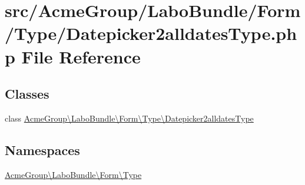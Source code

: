 \hypertarget{_datepicker2alldates_type_8php}{\section{src/\+Acme\+Group/\+Labo\+Bundle/\+Form/\+Type/\+Datepicker2alldates\+Type.php File Reference}
\label{_datepicker2alldates_type_8php}
}
\subsection*{Classes}
\begin{DoxyCompactItemize}
\item 
class \hyperlink{class_acme_group_1_1_labo_bundle_1_1_form_1_1_type_1_1_datepicker2alldates_type}{Acme\+Group\textbackslash{}\+Labo\+Bundle\textbackslash{}\+Form\textbackslash{}\+Type\textbackslash{}\+Datepicker2alldates\+Type}
\end{DoxyCompactItemize}
\subsection*{Namespaces}
\begin{DoxyCompactItemize}
\item 
 \hyperlink{namespace_acme_group_1_1_labo_bundle_1_1_form_1_1_type}{Acme\+Group\textbackslash{}\+Labo\+Bundle\textbackslash{}\+Form\textbackslash{}\+Type}
\end{DoxyCompactItemize}

